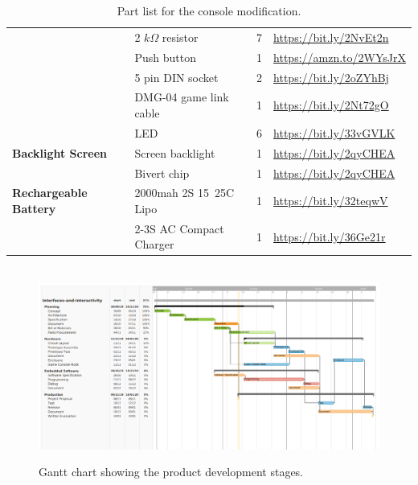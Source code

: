 \documentclass[]{article}
\begin{document}
\begin{appendices}
\begin{table}[h]
\begin{tabular}{|llcl|}
                            & 2 $k\Omega$ resistor & 7  & \url{https://bit.ly/2NvEt2n}\\
                            & Push button & 1  & \url{https://amzn.to/2WYsJrX}\\
                            & 5 pin DIN socket & 2  & \url{https://bit.ly/2oZYhBj}\\
                            & DMG-04 game link cable & 1  & \url{https://bit.ly/2Nt72gO}\\
                            & LED & 6  & \url{https://bit.ly/33vGVLK}\\
            \hline
            \textbf{Backlight Screen} & Screen backlight & 1 & \url{https://bit.ly/2qyCHEA} \\
                   & Bivert chip & 1 & \url{https://bit.ly/2qyCHEA} \\
            \hline
            \textbf{Rechargeable Battery} & 2000mah 2S 15~25C Lipo & 1 & \url{https://bit.ly/32teqwV} \\
            & 2-3S AC Compact Charger & 1 & \url{https://bit.ly/36Ge21r} \\
            \hline
            \end{tabular}
            \caption{Part list for the console modification.}
        \end{table}
        

            \appendix
            \begin{landscape}
                \begin{figure}[h!]
                \textbf{}\\ %
                \includegraphics[width=1.1\linewidth]{timescale.png}
                    \caption{Gantt chart showing the product development stages.}
                \end{figure}
            \end{landscape}
       


\end{appendices}
\end{document}
